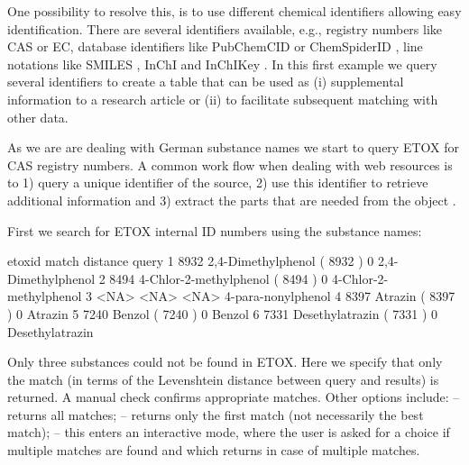 \documentclass[article]{jss}
\begin{document}
One possibility to resolve this, is to use different chemical
identifiers allowing easy identification.  There are several
identifiers available, e.g., registry numbers like CAS or EC, database
identifiers like PubChemCID \citep{Kim_2016} or ChemSpiderID
\citep{pence_chemspider:_2010}, line notations like SMILES
\citep{Weininger_1990}, InChI and InChIKey
\citep{Heller_McNaught_Pletnev_Stein_Tchekhovskoi_2015}.  In this
first example we query several identifiers to create a table that can
be used as (i) supplemental information to a research article or (ii)
to facilitate subsequent matching with other data.

As we are are dealing with German substance names we start to query ETOX for CAS registry numbers.
A common work flow when dealing with web resources is to 1) query a unique identifier of the source, 2) use this identifier to retrieve additional information and 3) extract the parts that are needed from the  object \citep{Chamberlain_Szocs_2013}.

First we search for ETOX internal ID numbers using the substance names:
%
\begin{CodeChunk}
\begin{CodeOutput}
  etoxid                           match distance                  query
1   8932     2,4-Dimethylphenol ( 8932 )        0     2,4-Dimethylphenol
2   8494 4-Chlor-2-methylphenol ( 8494 )        0 4-Chlor-2-methylphenol
3   <NA>                            <NA>     <NA>     4-para-nonylphenol
4   8397                Atrazin ( 8397 )        0                Atrazin
5   7240                 Benzol ( 7240 )        0                 Benzol
6   7331        Desethylatrazin ( 7331 )        0        Desethylatrazin
\end{CodeOutput}
\end{CodeChunk}
%
Only three substances could not be found in ETOX.  Here we specify
that only the  match (in terms of the Levenshtein
distance between query and results) is returned.  A manual check
confirms appropriate matches.  Other options include:  --
returns all matches;  -- returns only the first match
(not necessarily the best match);  -- this enters an
interactive mode, where the user is asked for a choice if multiple
matches are found and  which returns  in case of
multiple matches.
\end{document}

